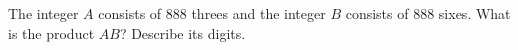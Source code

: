 The integer $A$ consists of $888$ threes and the integer $B$ consists of $888$ sixes. What is the product $AB$? Describe its digits.
